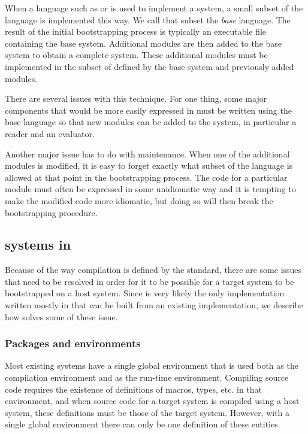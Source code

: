 When a language such as \clanguage{} or \cplusplus{} is used to
implement a \commonlisp{} system, a small subset of the
\commonlisp{} language is implemented this way.  We call that subset
the \emph{base} language.  The result of the initial bootstrapping
process is typically an executable file containing the base system.
Additional modules are then added to the base system to obtain a
complete \commonlisp{} system.  These additional modules must be
implemented in the subset of \commonlisp{} defined by the base system
and previously added modules.

There are several issues with this technique.  For one thing, some
major components that would be more easily expressed in \commonlisp{}
must be written using the base language so that new modules can be
added to the system, in particular a reader and an evaluator.

Another major issue has to do with maintenance.  When one of the
additional modules is modified, it is easy to forget exactly what
subset of the \commonlisp{} language is allowed at that point in the
bootstrapping process.  The code for a particular module must often be
expressed in some unidiomatic way and it is tempting to make the
modified code more idiomatic, but doing so will then break the
bootstrapping procedure.

\subsection{\commonlisp{} systems in \commonlisp{}}
\label{sec-cl-in-cl}

Because of the way compilation is defined by the \commonlisp{}
standard, there are some issues that need to be resolved in order for
it to be possible for a target \commonlisp{} system to be bootstrapped
on a host \commonlisp{} system.  Since \sbcl{} is very likely the only
\commonlisp{} implementation written mostly in \commonlisp{} that can
be built from an existing \commonlisp{} implementation, we describe
how \sbcl{} solves some of these issue.

\subsubsection{Packages and environments}
\label{sec-cl-in-cl}

Most existing \commonlisp{} systems have a single global environment
that is used both as the compilation environment and as the run-time
environment.  Compiling \commonlisp{} source code requires the
existence of definitions of macros, types, etc. in that environment,
and when source code for a target \commonlisp{} system is compiled
using a host \commonlisp{} system, these definitions must be those of
the target system.  However, with a single global environment there
can only be one definition of these entities.

